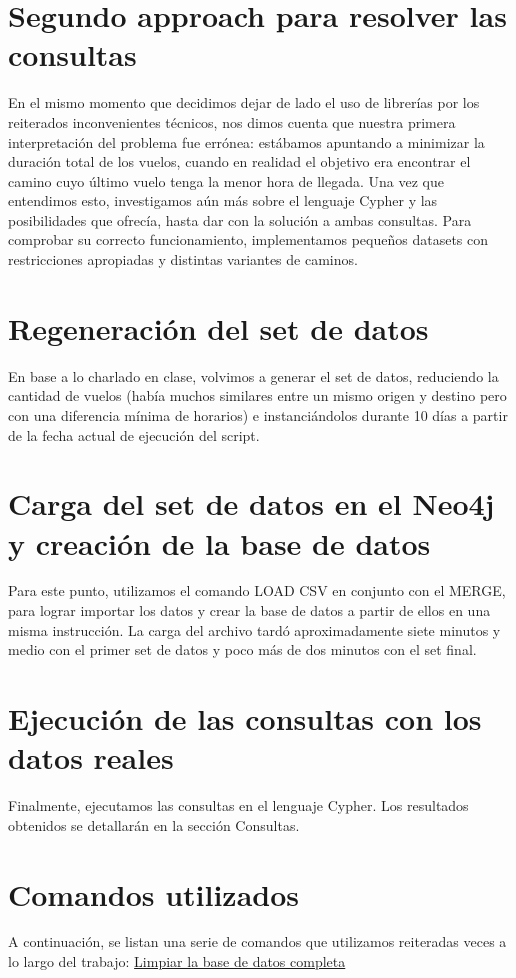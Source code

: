 \documentclass[a4paper,11pt]{article}
\begin{document}
\section{Segundo approach para resolver las consultas}
En el mismo momento que decidimos dejar de lado el uso de librerías por los reiterados inconvenientes técnicos, nos dimos cuenta que nuestra primera interpretación del problema fue errónea: estábamos apuntando a minimizar la duración total de los vuelos, cuando en realidad el objetivo era encontrar el camino cuyo último vuelo tenga la menor hora de llegada.
Una vez que entendimos esto, investigamos aún más sobre el lenguaje Cypher y las posibilidades que ofrecía, hasta dar con la solución a ambas consultas.
Para comprobar su correcto funcionamiento, implementamos pequeños datasets con restricciones apropiadas y distintas variantes de caminos.

\section{Regeneración del set de datos}
En base a lo charlado en clase, volvimos a generar el set de datos, reduciendo la cantidad de vuelos (había muchos similares entre un mismo origen y destino pero con una diferencia mínima de horarios) e instanciándolos durante 10 días a partir de la fecha actual de ejecución del script.

\section{Carga del set de datos en el Neo4j y creación de la base de datos}
Para este punto, utilizamos el comando LOAD CSV en conjunto con el MERGE, para lograr importar los datos y crear la base de datos a partir de ellos en una misma instrucción.
La carga del archivo tardó aproximadamente siete minutos y medio con el primer set de datos y poco más de dos minutos con el set final.

\section{Ejecución de las consultas con los datos reales}
Finalmente, ejecutamos las consultas en el lenguaje Cypher. Los resultados obtenidos se detallarán en la sección Consultas.

\newpage
\section*{Comandos utilizados}
A continuación, se listan una serie de comandos que utilizamos reiteradas veces a lo largo del trabajo:
\bigbreak
\underline{Limpiar la base de datos completa}\\
\end{document}
